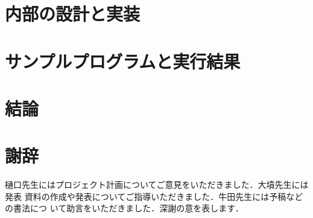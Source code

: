 \documentclass[a4paper,titlepage,report]{jsbook}
\begin{document}
\section{内部の設計と実装}\label{sc:impl}

\section{サンプルプログラムと実行結果}\label{sc:sample}

\section{結論}\label{sc:conclu}

\section*{謝辞}
樋口先生にはプロジェクト計画についてご意見をいただきました．大墳先生には発表
資料の作成や発表についてご指導いただきました．牛田先生には予稿などの書法につ
いて助言をいただきました．深謝の意を表します．




\backmatter
\appendix
\end{document}
